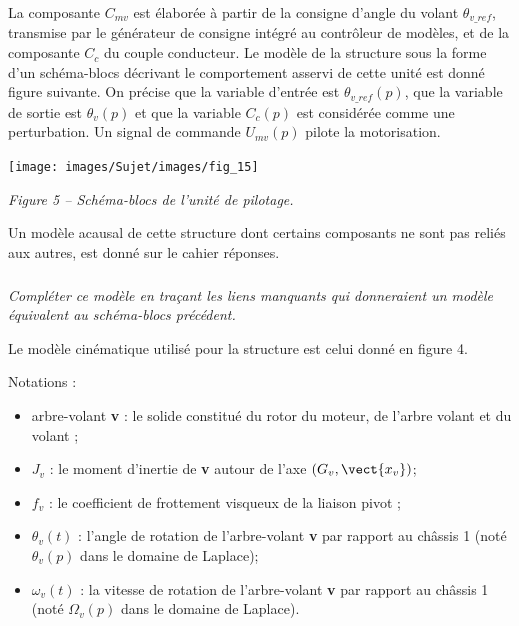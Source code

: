 \documentclass[10pt,fleqn]{article} %
\begin{document}
La composante $C_{mv}$ est élaborée à partir de la consigne d'angle du volant $\theta_{v\_ref}$, transmise par le
générateur de consigne intégré au contrôleur de modèles, et de la composante $C_c$ du couple
conducteur.
Le modèle de la structure sous la forme d'un schéma-blocs décrivant le comportement asservi de cette
unité est donné figure suivante. On précise que la variable d'entrée est $\theta_{v\_ref}(p)$, que la variable de sortie est $\theta_{v}(p)$ et que la variable $C_c(p)$ est considérée comme une perturbation. Un signal de commande
$U_{mv}(p)$ pilote la motorisation.


\begin{center}
\texttt{[image: images/Sujet/images/fig\_15]}

\textit{Figure 5 -- Schéma-blocs de l'unité de pilotage.}
\end{center}

Un modèle acausal de cette structure dont certains composants ne sont pas reliés aux autres, est
donné sur le cahier réponses.

\subparagraph{}
\textit{Compléter ce modèle en traçant les liens manquants qui donneraient un modèle équivalent au
schéma-blocs précédent.}
\ifprof
\begin{corrige}
\end{corrige}
\else
\fi

\vspace{.25cm}
Le modèle cinématique utilisé pour la structure est celui donné en figure 4.

Notations :
\begin{itemize}
\item arbre-volant \textbf{v} : le solide constitué du rotor du moteur, de l'arbre volant et du volant ;
\item $J_v$ : le moment d'inertie de \textbf{v} autour de l'axe $\left( G_v,\vect{x_v}\right)$;
\item $f_v$ : le coefficient de frottement visqueux de la liaison pivot ;
\item $\theta_v(t)$ : l'angle de rotation de l'arbre-volant \textbf{v} par rapport au châssis 1 (noté $\theta_v(p)$ dans le domaine de Laplace);
\item $\omega_v(t)$ : la vitesse de rotation de l'arbre-volant \textbf{v} par rapport au châssis 1 (noté $\Omega_v(p)$ dans le
domaine de Laplace).
\end{itemize}
\end{document}
